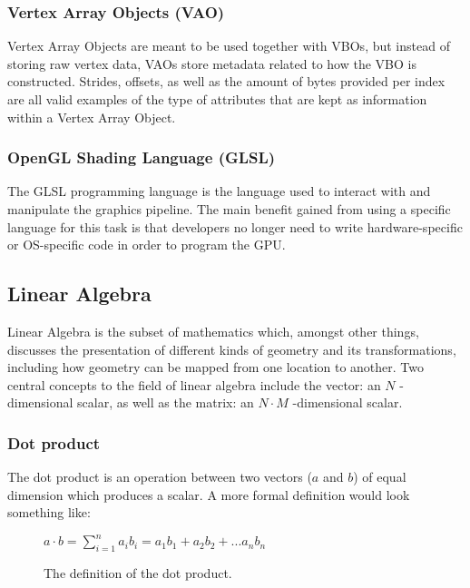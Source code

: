 \subsubsection{Vertex Array Objects (VAO)}

Vertex Array Objects are meant to be used together with VBOs, but instead of storing raw vertex data, VAOs store metadata related to how the VBO is constructed. Strides, offsets, as well as the amount of bytes provided per index are all valid examples of the type of attributes that are kept as information within a Vertex Array Object.

\subsubsection{OpenGL Shading Language (GLSL)}

The GLSL programming language is the language used to interact with and manipulate the graphics pipeline. The main benefit gained from using a specific language for this task is that developers no longer need to write hardware-specific or OS-specific code in order to program the GPU.\cite{glsl}

\subsection{Linear Algebra}

Linear Algebra is the subset of mathematics which, amongst other things, discusses the presentation of different kinds of geometry and its transformations, including how geometry can be mapped from one location to another. Two central concepts to the field of linear algebra include the vector: an $N$ -dimensional scalar, as well as the matrix: an $N\cdot M$ -dimensional scalar.

\subsubsection{Dot product}

The dot product is an operation between two vectors ($a$ and $b$) of equal dimension which produces a scalar. A more formal definition would look something like:

\begin{figure}[H]
	\begin{center}
		$a \cdot b = \sum_{i=1}^{n}{a_ib_i = a_1b_1 + a_2b_2 + ... a_nb_n}$
		\caption{The definition of the dot product.}
	\end{center}
\end{figure}

